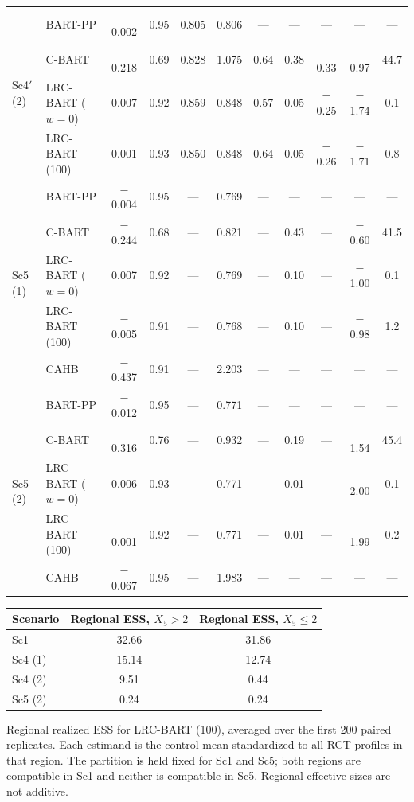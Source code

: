 \begin{longtable}{llccccccccc}
\midrule
\multirow{4}{*}{Sc4$'$ (2)} & BART-PP & $-$0.002 & 0.95 & 0.805 & 0.806 & --- & --- & --- & --- & --- \\*
& C-BART & $-$0.218 & 0.69 & 0.828 & 1.075 & 0.64 & 0.38 & $-$0.33 & $-$0.97 & 44.7 \\*
& LRC-BART ($w=0$) & 0.007 & 0.92 & 0.859 & 0.848 & 0.57 & 0.05 & $-$0.25 & $-$1.74 & 0.1 \\*
& LRC-BART (100) & 0.001 & 0.93 & 0.850 & 0.848 & 0.64 & 0.05 & $-$0.26 & $-$1.71 & 0.8 \\
\midrule
\multirow{5}{*}{Sc5 (1)} & BART-PP & $-$0.004 & 0.95 & --- & 0.769 & --- & --- & --- & --- & --- \\*
& C-BART & $-$0.244 & 0.68 & --- & 0.821 & --- & 0.43 & --- & $-$0.60 & 41.5 \\*
& LRC-BART ($w=0$) & 0.007 & 0.92 & --- & 0.769 & --- & 0.10 & --- & $-$1.00 & 0.1 \\*
& LRC-BART (100) & $-$0.005 & 0.91 & --- & 0.768 & --- & 0.10 & --- & $-$0.98 & 1.2 \\*
& CAHB & $-$0.437 & 0.91 & --- & 2.203 & --- & --- & --- & --- & --- \\
\midrule
\multirow{5}{*}{Sc5 (2)} & BART-PP & $-$0.012 & 0.95 & --- & 0.771 & --- & --- & --- & --- & --- \\*
& C-BART & $-$0.316 & 0.76 & --- & 0.932 & --- & 0.19 & --- & $-$1.54 & 45.4 \\*
& LRC-BART ($w=0$) & 0.006 & 0.93 & --- & 0.771 & --- & 0.01 & --- & $-$2.00 & 0.1 \\*
& LRC-BART (100) & $-$0.001 & 0.92 & --- & 0.771 & --- & 0.01 & --- & $-$1.99 & 0.2 \\*
& CAHB & $-$0.067 & 0.95 & --- & 1.983 & --- & --- & --- & --- & --- \\
\end{longtable}
\endgroup
\begin{center}\scriptsize
\par\medskip
\begin{tabular}{lcc}
\toprule
Scenario & Regional ESS, $X_5>2$ & Regional ESS, $X_5\le2$ \\
\midrule
Sc1 & 32.66 & 31.86 \\
Sc4 (1) & 15.14 & 12.74 \\
Sc4 (2) & 9.51 & 0.44 \\
Sc5 (2) & 0.24 & 0.24 \\
\bottomrule
\end{tabular}
\par\smallskip\parbox{\textwidth}{\scriptsize Regional realized ESS for LRC-BART (100), averaged over the first 200 paired replicates. Each estimand is the control mean standardized to all RCT profiles in that region. The partition is held fixed for Sc1 and Sc5; both regions are compatible in Sc1 and neither is compatible in Sc5. Regional effective sizes are not additive.}
\end{center}
